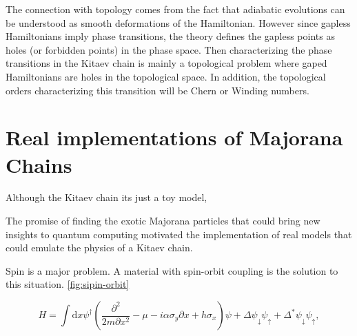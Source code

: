 The connection with topology comes from the fact that adiabatic evolutions can be understood as smooth deformations of the Hamiltonian. However since gapless Hamiltonians imply phase transitions, the theory defines the gapless points as holes (or forbidden points) in the phase space. Then characterizing the phase transitions in the Kitaev chain is mainly a topological problem where gaped Hamiltonians are holes in the topological space. In addition, the topological orders characterizing this transition will be Chern or Winding numbers. \\










\section{Real implementations of Majorana Chains}

Although the Kitaev chain its just a toy model, 

The promise of finding the exotic Majorana particles that could bring new insights to quantum computing motivated the implementation of real models that could emulate the physics of a Kitaev chain. 

Spin is a major problem. A material with spin-orbit coupling is  the solution to this situation. \ref{fig:sipin-orbit} 

\begin{equation}
    H =\int\mbox{d}x\psi^{\dagger}\left(\frac{\partial^{2}}{2m\partial x^{2}}-\mu -i\alpha\sigma_{y}\partial x+h\sigma_{x}\right)\psi+\Delta\psi_{\downarrow}\psi_{\uparrow}+\Delta^{*}\psi_{\downarrow}\psi_{\uparrow},
    \label{eq:MajoranaChainHam}
\end{equation}




